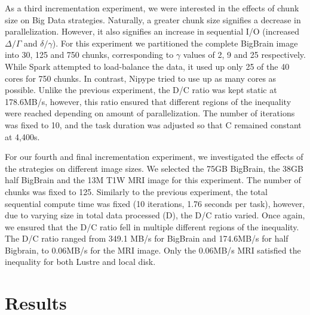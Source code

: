 \documentclass{IEEEtran}
\begin{document}
As a third incrementation experiment, we were interested in the effects of 
chunk size on Big Data strategies. Naturally, a greater chunk size signifies 
a decrease in parallelization. However, it also signifies an increase in 
sequential I/O (increased $\Delta/\Gamma$ and $\delta/\gamma$). For 
this experiment we partitioned the complete BigBrain image into 30, 125 
and 750 chunks, corresponding to $\gamma$ values of 2, 9 and 25 
respectively. While Spark attempted to load-balance the data, it used 
up only 25 of the 40 cores for 750 chunks. In contrast, Nipype tried to 
use up as many cores as possible. Unlike the previous 
experiment, the D/C ratio was kept static at 178.6MB/s, however, this 
ratio ensured that different regions of the inequality were reached 
depending on amount of parallelization. The number of iterations was
fixed to 10, and the task duration was adjusted so that C remained constant at 4,400s.

For our fourth and final incrementation experiment, we investigated the effects 
of the strategies on different image sizes. We selected the 75GB BigBrain, the
38GB half BigBrain and the 13M T1W MRI image for this experiment. The number of
chunks was fixed to 125. Similarly to the previous experiment, the 
total sequential compute time was fixed (10 iterations, 1.76 seconds 
per task), however, due to varying size in total data processed (D), 
the D/C ratio varied. Once again, we ensured that the D/C ratio fell in 
multiple different regions of the inequality. The D/C ratio ranged from 
349.1 MB/s for BigBrain and 174.6MB/s for half Bigbrain, to 0.06MB/s for the MRI 
image. Only the 0.06MB/s MRI satisfied the inequality for both Lustre and local 
disk.









\section{Results} %
\label{sec:results}
\end{document}
